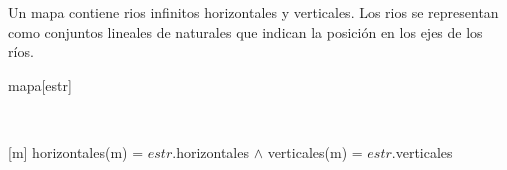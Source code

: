 \begin{Representacion}
  
  
    Un mapa contiene rios infinitos horizontales y verticales. Los rios se
    representan como conjuntos lineales de naturales que indican la posición en
    los ejes de los ríos.
  
    \begin{Estructura}{mapa}[estr]
      \begin{Tupla}[estr]
      \end{Tupla}
  
    \end{Estructura}
    
  
      ~ 
  
    [m]{
        horizontales(m) = $estr$.horizontales $\land$ 
        verticales(m) = $estr$.verticales
    }
  
  \end{Representacion}
